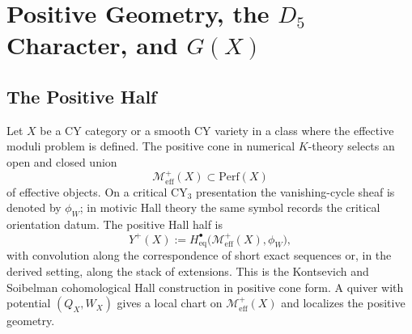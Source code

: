 \providecommand{\kBKM}{\kappa_{\mathrm{BKM}}}
\providecommand{\kch}{\kappa_{\mathrm{ch}}}
\providecommand{\kcat}{\kappa_{\mathrm{cat}}}
\providecommand{\kfib}{\kappa_{\mathrm{fiber}}}
\providecommand{\CYcat}{\mathrm{CY}\text{-cat}}
\providecommand{\ChirAlg}{\mathrm{ChirAlg}}
\providecommand{\HolFA}{\mathrm{HolFA}}
\providecommand{\Sp}{\mathrm{Sp}}
\providecommand{\SpCh}{\mathrm{Sp}^{\mathrm{ch}}}
\providecommand{\Coh}{\mathrm{Coh}}
\providecommand{\CoHA}{\mathrm{CoHA}}
\providecommand{\Meff}{\mathcal{M}^{+}_{\mathrm{eff}}}
\providecommand{\Heq}{H^{\bullet}_{\mathrm{eq}}}
\providecommand{\PhiFA}{\Phi^{\mathrm{FA}}}
\providecommand{\C}{\mathbb{C}}
\providecommand{\ZZ}{\mathbb{Z}}
\providecommand{\bP}{\mathbb{P}}
\providecommand{\cO}{\mathcal{O}}
\providecommand{\cF}{\mathcal{F}}
\providecommand{\cZ}{\mathcal{Z}}
\providecommand{\Rep}{\mathrm{Rep}}
\providecommand{\frakg}{\mathfrak{g}}
\providecommand{\fgl}{\mathfrak{gl}}
\providecommand{\Eone}{E_1}
\providecommand{\Etwo}{E_2}

\section*{Positive Geometry, the $D_5$ Character, and $G(X)$}
\label{note:positive-geometry-d5-character}

\subsection*{The Positive Half}
\label{note:positive-half}

Let \(X\) be a CY category or a smooth CY variety in a class where the
effective moduli problem is defined. The positive cone in numerical
\(K\)-theory selects an open and closed union
\[
 \Meff(X)\subset \mathrm{Perf}(X)
\]
of effective objects. On a critical CY$_3$ presentation the
vanishing-cycle sheaf is denoted by \(\phi_W\); in motivic Hall theory
the same symbol records the critical orientation datum. The positive
Hall half is
\[
 Y^{+}(X)
 :=
 \Heq\!\bigl(\Meff(X),\phi_W\bigr),
\]
with convolution along the correspondence of short exact sequences or,
in the derived setting, along the stack of extensions. This is the
Kontsevich and Soibelman cohomological Hall construction in positive
cone form. A quiver with potential \((Q_X,W_X)\) gives a local chart
on \(\Meff(X)\) and localizes the positive geometry.

